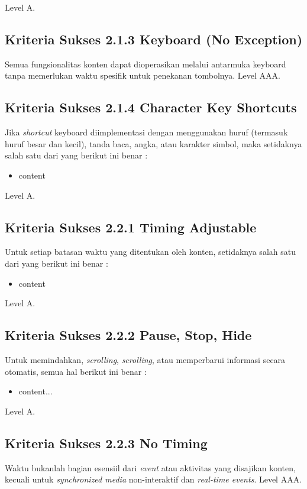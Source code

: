 Level A.

\subsection{Kriteria Sukses 2.1.3 Keyboard (No Exception)}
\label{sec:kriteria_2.1.3}
Semua fungsionalitas konten dapat dioperasikan melalui antarmuka keyboard tanpa memerlukan waktu spesifik untuk penekanan tombolnya.
Level AAA.

\subsection{Kriteria Sukses 2.1.4 Character Key Shortcuts}
\label{sec:kriteria_2.1.4}
Jika \textit{shortcut} keyboard diimplementasi dengan menggunakan huruf (termasuk huruf besar dan kecil), tanda baca, angka, atau karakter simbol, maka setidaknya salah satu dari yang berikut ini benar :

\begin{itemize}
	\item content
\end{itemize}

Level A.

\subsection{Kriteria Sukses 2.2.1 Timing Adjustable}
\label{sec:kriteria_2.2.1}
Untuk setiap batasan waktu yang ditentukan oleh konten, setidaknya salah satu dari yang berikut ini benar :

\begin{itemize}
	\item content
\end{itemize}
Level A.

\subsection{Kriteria Sukses 2.2.2 Pause, Stop, Hide}
\label{sec:kriteria_2.2.2}
Untuk memindahkan, \textit{scrolling}, \textit{scrolling}, atau memperbarui informasi secara otomatis, semua hal berikut ini benar :

\begin{itemize}
	\item content...
\end{itemize}

Level A.

\subsection{Kriteria Sukses 2.2.3 No Timing}
\label{sec:kriteria_2.2.3}
Waktu bukanlah bagian esensiil dari \textit{event} atau aktivitas yang disajikan konten, kecuali untuk \textit{synchronized media} non-interaktif dan \textit{real-time events}.
Level AAA.

